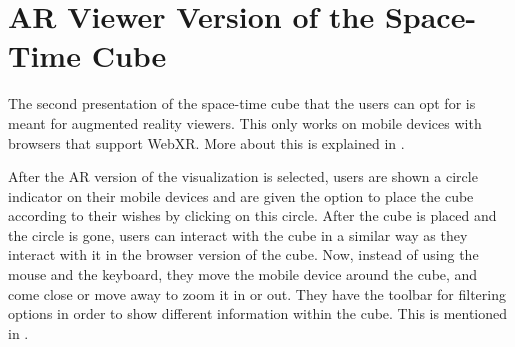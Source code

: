 \section{AR Viewer Version of the Space-Time Cube}\label{sec:ar-version}
The second presentation of the space-time cube that the users can opt for is meant for augmented reality viewers. This only works on
mobile devices with browsers that support WebXR. More about this is explained in .

After the AR version of the visualization is selected,
users are shown a circle indicator on their mobile devices and are given the option to place the cube according to their wishes by clicking on this circle.
After the cube is placed and the circle is gone, users can interact with the cube in a similar way as they interact with it in the browser version of the
cube. Now, instead of using the mouse and the keyboard, they move the mobile device around the cube, and come close or move away to zoom it in or out. They
have the toolbar for filtering options in order to show different information within the cube. This is mentioned in
.

